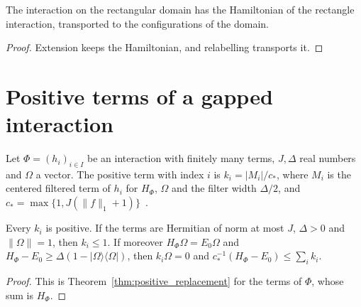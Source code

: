 \begin{lemma}
    \label{lem:hamiltonians_rectangle_to_plane}
    \leanok
    The interaction on the rectangular domain has the Hamiltonian of the rectangle
    interaction, transported to the configurations of the domain.
\end{lemma}
\begin{proof}
    \leanok
    Extension keeps the Hamiltonian, and relabelling transports it.
\end{proof}

\section{Positive terms of a gapped interaction}
\label{sec:hamiltonians_positive_term}

\begin{definition}
    \label{def:hamiltonians_positive_term}
    \leanok
    Let $\Phi=(h_i)_{i\in I}$ be an interaction with finitely many terms, $J,\Delta$ real
    numbers and $\Omega$ a vector. The positive term with index $i$ is
    $k_i=\lvert M_i\rvert/c_*$, where $M_i$ is the centered filtered term of $h_i$ for
    $H_\Phi$, $\Omega$ and the filter width $\Delta/2$, and
    $c_*=\max\{1,J(\lVert f\rVert_1+1)\}$~\cite{OpenAI2026AreaLaw}.
\end{definition}

\begin{theorem}
    \label{thm:hamiltonians_positive_term}
    \leanok
    Every $k_i$ is positive. If the terms are Hermitian of norm at most $J$, $\Delta>0$
    and $\lVert\Omega\rVert=1$, then $k_i\le1$. If moreover $H_\Phi\Omega=E_0\Omega$ and
    $H_\Phi-E_0\ge\Delta(1-\lvert\Omega\rangle\langle\Omega\rvert)$, then $k_i\Omega=0$
    and $c_*^{-1}(H_\Phi-E_0)\le\sum_ik_i$.
\end{theorem}
\begin{proof}
    \leanok
    This is Theorem~\ref{thm:positive_replacement} for the terms of $\Phi$, whose sum
    is $H_\Phi$.
\end{proof}

